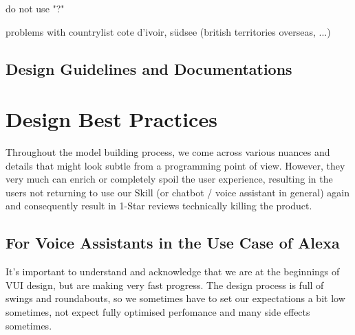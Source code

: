 do not use "?"


problems with countrylist
cote d'ivoir, südsee (british territories overseas, ...)



\section{Design Guidelines and Documentations}
\label{designGuide}






\chapter{Design Best Practices}
\label{designbestprac}


Throughout the model building process, we come across various nuances and details that might look subtle from a programming point of view. However, they very much can enrich or completely spoil the user experience, resulting in the users not returning to use our Skill (or chatbot / voice assistant in general) again and consequently result in 1-Star reviews technically killing the product.



\section{For Voice Assistants in the Use Case of Alexa}
\label{designalexa:bestprac}





It's important to understand and acknowledge that we are at the beginnings of VUI design, but are making very fast progress. The design process is full of swings and roundabouts, so we sometimes have to set our expectations a bit low sometimes, not expect fully optimised perfomance and many side effects sometimes.
  
